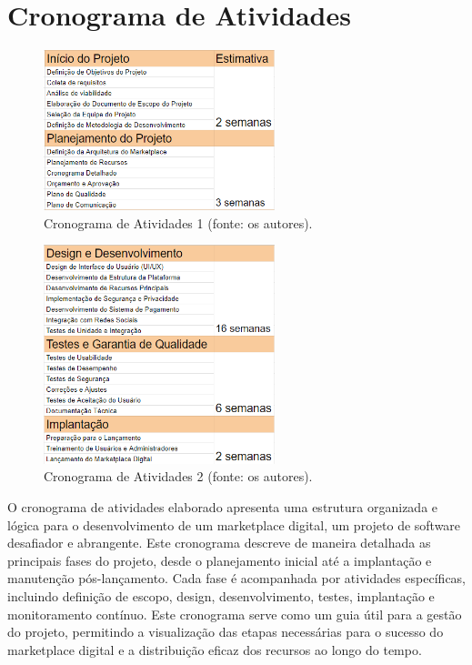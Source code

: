 \documentclass[
	12pt,				%
	openright,			%
	twoside,			%
	a4paper,			%
	english,			%
	brazil				%
	]{abntex2}
\begin{document}
\section{Cronograma de Atividades}


\begin{figure}[htb]
	\centering
	\includegraphics[width=0.6\textwidth]{img/cronatv1}
	\caption{Cronograma de Atividades 1 (fonte: os autores).}
	\label{fig:cronatv1}
\end{figure}

\begin{figure}[htb]
	\centering
	\includegraphics[width=0.6\textwidth]{img/cronatv2}
	\caption{Cronograma de Atividades 2 (fonte: os autores).}
	\label{fig:cronatv2}
\end{figure}

O cronograma de atividades elaborado apresenta uma estrutura organizada e lógica para o desenvolvimento de um marketplace digital, um projeto de software desafiador e abrangente. Este cronograma descreve de maneira detalhada as principais fases do projeto, desde o planejamento inicial até a implantação e manutenção pós-lançamento. Cada fase é acompanhada por atividades específicas, incluindo definição de escopo, design, desenvolvimento, testes, implantação e monitoramento contínuo. Este cronograma serve como um guia útil para a gestão do projeto, permitindo a visualização das etapas necessárias para o sucesso do marketplace digital e a distribuição eficaz dos recursos ao longo do tempo.
\end{document}
